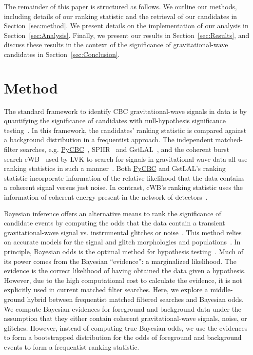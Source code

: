 \documentclass[%
 nofootinbib,
 amsmath,amssymb,
 aps,
 twocolumn,
 superscriptaddress
]{revtex4-2}
\newcommand{\gstlal}{{\sc GstLAL}\xspace}
\newcommand{\cwb}{{\sc cWB}\xspace}
\newcommand{\spiir}{{\sc SPIIR}\xspace}
\newcommand{\pycbc}{{\sc \href{https://pycbc.org/}{{PyCBC}}}\xspace}
\begin{document}
The remainder of this paper is structured as follows. We outline our methods, including details of our ranking statistic and the retrieval of our candidates in Section~\ref{sec:method}. We present details on the implementation of our analysis in Section~\ref{sec:Analysis}. Finally, we present our results in Section~\ref{sec:Results}, and discuss these results in the context of the significance of gravitational-wave candidates in Section~\ref{sec:Conclusion}.

\section{Method\label{sec:method}}

The standard framework to identify CBC gravitational-wave signals in data is by quantifying the significance of candidates with null-hypothesis significance testing~\cite{GWTC1, GWTC2}. In this framework, the candidates' ranking statistic is compared against a background distribution in a frequentist approach. The independent matched-filter searches, e.g. \pycbc~\cite{pycbc_og4}, \spiir~\cite{spiir} and \gstlal~\cite{sachdev2019gstlal}, and the coherent burst search \cwb~\cite{cwb} used by LVK to search for signals in gravitational-wave data all use ranking statistics in such a manner~\cite{GWTC1}. Both \pycbc and \gstlal's ranking statistic incorporate information of the relative likelihood that the data contains a coherent signal versus just noise. In contrast, \cwb's ranking statistic uses the information of coherent energy present in the network of detectors~\cite{GWTC1}. 

Bayesian inference offers an alternative means to rank the significance of candidate events by computing the odds that the data contain a transient gravitational-wave signal vs. instrumental glitches or noise~\cite{BCR1}. This method relies on accurate models for the signal and glitch morphologies and populations~\cite{BCR1}. In principle, Bayesian odds is the optimal method for hypothesis testing~\cite{BCR2}. Much of its power comes from the Bayesian ``evidence'': a marginalized likelihood. The evidence is the correct likelihood of having obtained the data given a hypothesis. However, due to the high computational cost to calculate the evidence, it is not explicitly used in current matched filter searches. Here, we explore a middle-ground hybrid between frequentist matched filtered searches and Bayesian odds. We compute Bayesian evidences for foreground and background data under the assumption that they either contain coherent gravitational-wave signals, noise, or glitches. However, instead of computing true Bayesian odds, we use the evidences to form a bootstrapped distribution for the odds of foreground and background events to form a frequentist ranking statistic.
\end{document}
